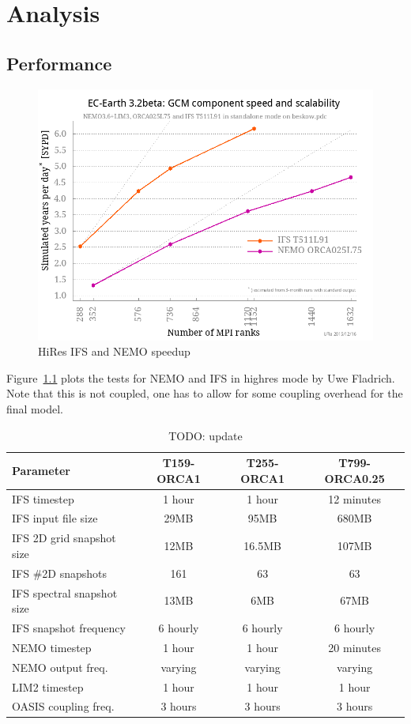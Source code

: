 
\chapter{Analysis}

\section{Performance}

\begin{figure}[h!]
    \centering
    \includegraphics[scale=0.4]{figs/ece32b-speedup}
    \caption{HiRes IFS and NEMO speedup}
    \label{fig:hires-speed}
\end{figure}

Figure~\ref{fig:hires-speed} plots the tests for NEMO and IFS in highres mode by Uwe Fladrich. Note that
this is not coupled, one has to allow for some coupling overhead for the final model.

\begin{table}
\begin{tabular}{|l|c|c|c|}
    \hline
    Parameter& T159-ORCA1& T255-ORCA1& T799-ORCA0.25\\
    \hline
    IFS timestep& 1 hour& 1 hour& 12 minutes\\
    IFS input file size& 29MB& 95MB& 680MB\\
    IFS 2D grid snapshot size& 12MB& 16.5MB& 107MB\\
    IFS \#2D snapshots& 161& 63& 63\\
    IFS spectral snapshot size& 13MB& 6MB& 67MB\\
    IFS snapshot frequency& 6 hourly& 6 hourly& 6 hourly\\
    NEMO timestep& 1 hour& 1 hour& 20 minutes\\
    NEMO output freq.& varying& varying& varying\\
    LIM2 timestep& 1 hour& 1 hour& 1 hour\\
    OASIS coupling freq.& 3 hours& 3 hours& 3 hours    \\
    \hline 
\end{tabular}
\caption{TODO: update}
\end{table}

